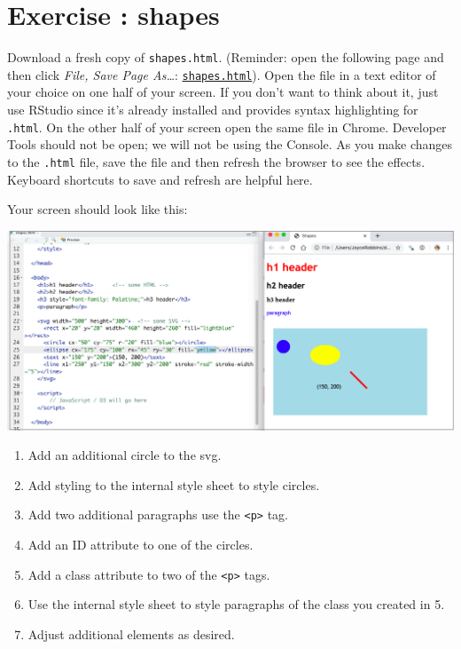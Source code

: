 \documentclass[openany]{book}
\begin{document}
\hypertarget{exercise-shapes}{%
\section{Exercise : shapes}\label{exercise-shapes}}

Download a fresh copy of \texttt{shapes.html}. (Reminder: open the following page and then click \emph{File, Save Page As\ldots{}}: \href{https://raw.githubusercontent.com/jtr13/d3book/master/code/shapes.html}{\texttt{shapes.html}}). Open the file in a text editor of your choice on one half of your screen. If you don't want to think about it, just use RStudio since it's already installed and provides syntax highlighting for \texttt{.html}. On the other half of your screen open the same file in Chrome. Developer Tools should not be open; we will not be using the Console. As you make changes to the \texttt{.html} file, save the file and then refresh the browser to see the effects. Keyboard shortcuts to save and refresh are helpful here.

Your screen should look like this:

\begin{center}\includegraphics[width=0.8\linewidth]{images/editor_chrome} \end{center}

\begin{enumerate}
\def\labelenumi{\arabic{enumi}.}
\item
  Add an additional circle to the svg.
\item
  Add styling to the internal style sheet to style circles.
\item
  Add two additional paragraphs use the \texttt{\textless{}p\textgreater{}} tag.
\item
  Add an ID attribute to one of the circles.
\item
  Add a class attribute to two of the \texttt{\textless{}p\textgreater{}} tags.
\item
  Use the internal style sheet to style paragraphs of the class you created in 5.
\item
  Adjust additional elements as desired.
\end{enumerate}
\end{document}
